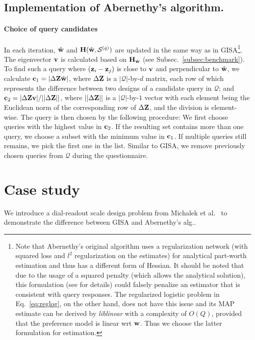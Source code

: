 \documentclass[onecolumn,11pt]{article}
\newcommand{\cutsectionup}{\vspace*{-0.1in}}
\newcommand{\cutsubsectionup}{\vspace*{-0.09in}}
\newcommand{\cutsectionup}{}
\newcommand{\cutsubsectionup}{}
\begin{document}
\cutsubsectionup
\subsection{Implementation of Abernethy's algorithm.}
\label{sec:implementationaabernethy}
\paragraph{Choice of query candidates} In each iteration, $\hat{\bf w}$ and ${\bf H}(\hat{\bf w},\mathcal{S}^{(q)})$ are updated in the same way as in GISA\footnote{Note that Abernethy's original algorithm uses a regularization network (with squared loss and $l^2$ regularization on the estimates) for analytical part-worth estimation and thus has a different form of Hessian. It should be noted that due to the usage of a squared penalty (which allows the analytical solution), this formulation (see \cite{abernethy2008eliciting} for details) could falsely penalize an estimator that is consistent with query responses. The regularized logistic problem in Eq.~\eqref{eq:reglog}, on the other hand, does not have this issue and its MAP estimate can be derived by {\it liblinear} with a complexity of $O(Q)$, provided that the preference model is linear wrt ${\bf w}$. Thus we choose the latter formulation for estimation.}. The eigenvector ${\bf v}$ is calculated based on ${\bf H}_{\hat{\bf w}}$ (see Subsec.~\ref{subsec:benchmark}). To find such a query where $({\bf z}_{i}-{\bf z}_{j})$ is close to ${\bf v}$ and perpendicular to $\hat{\bf w}$, we calculate ${\bf c}_1 = |\Delta {\bf Z}\hat{\bf w}|$, where $\Delta {\bf Z}$ is a $|\mathcal{Q}|$-by-$d$ matrix, each row of which represents the difference between two designs of a candidate query in $\mathcal{Q}$; and ${\bf c}_2= |\Delta {\bf Z}{\bf v}|/||\Delta {\bf Z}||$, where $||\Delta {\bf Z}||$ is a $|\mathcal{Q}|$-by-$1$ vector with each element being the Euclidean norm of the corresponding row of $\Delta {\bf Z}$, and the division is element-wise. The query is then chosen by the following procedure: We first choose queries with the highest value in ${\bf c}_2$. If the resulting set contains more than one query, we choose a subset with the minimum value in ${\bf c}_1$. If multiple queries still remains, we pick the first one in the list. Similar to GISA, we remove previously chosen queries from $\mathcal{Q}$ during the questionnaire.


\cutsectionup
\section{Case study}
\label{sec:case}
We introduce a dial-readout scale design problem from Michalek et al.~\cite{michalek2005linking} to demonstrate the difference between GISA and Abernethy's alg.. 
\end{document}
